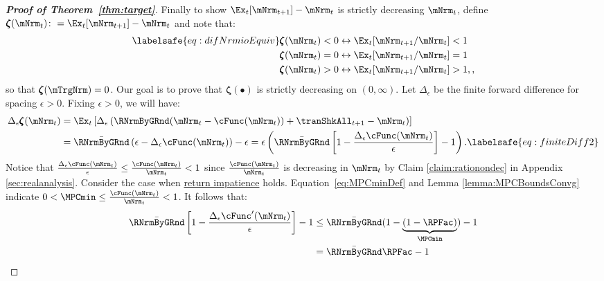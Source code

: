 \documentclass[\econtexRoot/BufferStockTheory]{subfiles}
\begin{document}
\begin{proof}[\textbf{Proof of Theorem~\ref{thm:target}}]
Finally to show $\Ex_t [{\mNrm}_{t+1}] -\mNrm_t$ is strictly decreasing $\mNrm_t$, define \providecommand{\difFunc}{\pmb{\zeta}} $\difFunc(\mNrm_t) \colon = 
\Ex_t[\mNrm_{t+1}] - \mNrm_t$ and note that:
%
\begin{align}\labelsafe{eq:difNrmioEquiv}
  \difFunc(\mNrm_t) < 0 &\leftrightarrow \Ex_t[{\mNrm}_{t+1}/\mNrm_t] < 1 
                          \nonumber\\
  \difFunc(\mNrm_t) = 0 &\leftrightarrow \Ex_t[{\mNrm}_{t+1}/\mNrm_t] = 1\\
  \difFunc(\mNrm_t) > 0 &\leftrightarrow \Ex_t[{\mNrm}_{t+1}/\mNrm_t] > 
                          1,\nonumber,
\end{align}
%
so that $\difFunc(\mTrgNrm)=0$.
Our goal is to prove that $\difFunc(\bullet)$ is strictly  decreasing on $(0,\infty)$.
Let $\Delta_{\epsilon}$ be the finite forward difference for spacing $\epsilon>0$.
Fixing $\epsilon>0$, we will have: 
%
\begin{align}
  \Delta_{\epsilon}\difFunc(\mNrm_{t}) & 			= \Ex_{t}\left[\Delta_{\epsilon} \left( {\RNrmByGRnd}(\mNrm_{t}-\cFunc(\mNrm_{t}))+%
                                                                       {\tranShkAll}_{t+1} - {\mNrm}_t\right) \right] \notag \\
                                                  & =  \bar{\RNrmByGRnd}\left( \epsilon-
                                                       \Delta_{\epsilon}\cFunc({\mNrm}_t)\right) - \epsilon = \epsilon\left( \bar{\RNrmByGRnd}\left[1-
                                                       \frac{\Delta_{\epsilon}\cFunc({\mNrm}_t)}{\epsilon}\right]- 1\right). \labelsafe{eq:finiteDiff2}
\end{align}
%
Notice  that $\frac{\Delta_{\epsilon}\cFunc({\mNrm}_t)}{\epsilon} \leq \frac{\cFunc(\mNrm_{t})}{\mNrm_{t}}<1$ since $\frac{\cFunc(\mNrm_{t})}{\mNrm_{t}}$ is decreasing in $\mNrm_{t}$ by Claim \ref{claim:rationondec} in Appendix \ref{sec:realanalysis}.
Consider the case when \hyperlink{RIC}{return impatience} holds.
Equation~\eqref{eq:MPCminDef} and Lemma \ref{lemma:MPCBoundsConvg} indicate $0 < \MPCmin \leq \frac{\cFunc(\mNrm_{t})}{\mNrm_{t}} < 1$.
%
It follows that:
%
\begin{align*}
  \bar{\RNrmByGRnd}\left[1-\frac{\Delta_{\epsilon}\cFunc^{\prime}({\mNrm}_t)}{\epsilon}\right]- 1 & \leq  \bar{\RNrmByGRnd}(1-\underbrace{(1-\RPFac)}_{\MPCmin}) - 1  \\
                                                            & = \bar{\RNrmByGRnd}\RPFac - 1 \\

\end{align*}
\end{proof}
\end{document}
